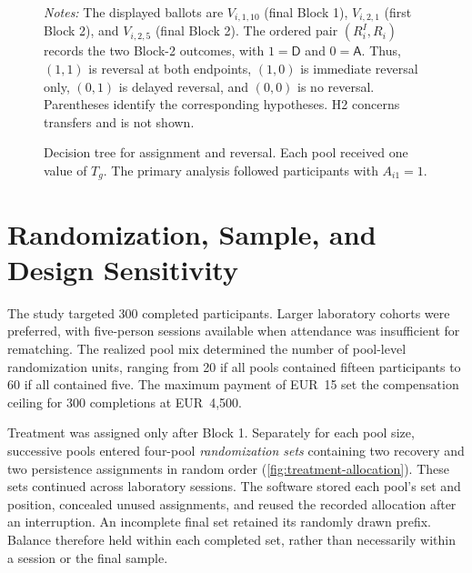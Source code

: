 \documentclass[11pt]{article}
\newcommand{\Dproc}{\textsf{D}}
\newcommand{\Aproc}{\textsf{A}}
\begin{document}
\begin{figure}[H]
\caption{Decision tree for assignment and reversal. Each pool received one value of $T_g$. The primary analysis followed participants with $A_{i1}=1$.}
\label{fig:decision-timeline}
\begin{minipage}{0.96\textwidth}
\footnotesize\emph{Notes:} The displayed ballots are $V_{i,1,10}$ (final Block 1), $V_{i,2,1}$ (first Block 2), and $V_{i,2,5}$ (final Block 2). The ordered pair $(R_i^{I},R_i)$ records the two Block-2 outcomes, with $1=\Dproc$ and $0=\Aproc$. Thus, $(1,1)$ is reversal at both endpoints, $(1,0)$ is immediate reversal only, $(0,1)$ is delayed reversal, and $(0,0)$ is no reversal. Parentheses identify the corresponding hypotheses. H2 concerns transfers and is not shown.
\end{minipage}
\end{figure}

\section{Randomization, Sample, and Design Sensitivity}

The study targeted 300 completed participants. Larger laboratory cohorts were preferred, with five-person sessions available when attendance was insufficient for rematching. The realized pool mix determined the number of pool-level randomization units, ranging from 20 if all pools contained fifteen participants to 60 if all contained five. The maximum payment of EUR~15 set the compensation ceiling for 300 completions at EUR~4,500.

Treatment was assigned only after Block 1. Separately for each pool size, successive pools entered four-pool \emph{randomization sets} containing two recovery and two persistence assignments in random order (\autoref{fig:treatment-allocation}). These sets continued across laboratory sessions. The software stored each pool's set and position, concealed unused assignments, and reused the recorded allocation after an interruption. An incomplete final set retained its randomly drawn prefix. Balance therefore held within each completed set, rather than necessarily within a session or the final sample.
\end{document}
